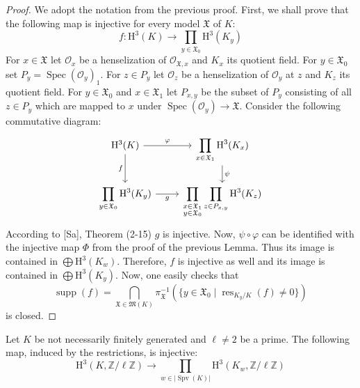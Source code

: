 \begin{proof}
We adopt the notation from the previous proof. First, we shall prove that the following map is injective for every model $\mathfrak{X}$ of $K$:
\[ f: \mathrm{H}^3(K) \to \prod_{y\in\mathfrak{X}_0}\mathrm{H}^3(K_y) \]
For $x\in\mathfrak{X}$ let $\mathcal{O}_x$ be a henselization of $\mathcal{O}_{\mathfrak{X}, x}$ and $K_x$ its quotient field. For $y\in\mathfrak{X}_0$ set $P_y=\operatorname{Spec}(\mathcal{O}_y)_1$. For $z\in P_y$ let $\mathcal{O}_z$ be a henselization of $\mathcal{O}_y$ at $z$ and $K_z$ its quotient field. For $y\in\mathfrak{X}_0$ and $x\in\mathfrak{X}_1$ let $P_{x,y}$ be the subset of $P_y$ consisting of all $z\in P_y$ which are mapped to $x$ under $\operatorname{Spec}(\mathcal{O}_y)\to\mathfrak{X}$. Consider the following commutative diagram:
\[ \begin{tikzcd}
\mathrm{H}^3(K)\ar[r, "\varphi"]\ar[d, "f"'] & \displaystyle\prod_{x\in\mathfrak{X}_1}\mathrm{H}^3(K_x)\ar[d, "\psi"]\\
\displaystyle\prod_{y\in\mathfrak{X}_0}\mathrm{H}^3(K_y) \ar[r, "g"']& \displaystyle\prod_{\substack{x\in\mathfrak{X}_1 \\ y\in\mathfrak{X}_0}}\prod_{z\in P_{x,y}}\mathrm{H}^3(K_z)
\end{tikzcd} \]
According to [Sa], Theorem (2-15) $g$ is injective. Now, $\psi\circ\varphi$ can be identified with the injective map $\Phi$ from the proof of the previous Lemma. Thus its image is contained in $\bigoplus\mathrm{H}^3(K_w)$. Therefore, $f$ is injective as well and its image is contained in $\bigoplus\mathrm{H}^3(K_y)$. Now, one easily checks that
\[ \operatorname{supp}(f) = \bigcap_{\mathfrak{X}\in \mathfrak{M}(K)} \pi_\mathfrak{X}^{-1}(\{ y\in\mathfrak{X}_0\mid \operatorname{res}_{K_y/K}(f)\neq 0 \}) \]
is closed.
\end{proof}

\begin{lemma}\label{2.4}
Let $K$ be not necessarily finitely generated and $\ell\neq 2$ be a prime. The following map, induced by the restrictions, is injective:
\[ \mathrm{H}^3(K,\mathbb{Z}/\ell\mathbb{Z})\to\prod_{w\in |\operatorname{Spv}(K)| }\mathrm{H}^3(K_w,\mathbb{Z}/\ell\mathbb{Z}) \]
\end{lemma}

